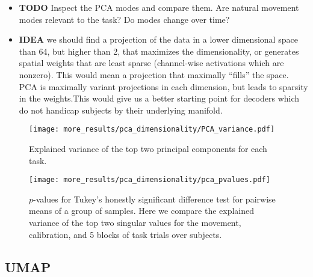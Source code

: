 \documentclass[../main.tex]{subfiles}
\begin{document}
\begin{itemize}
  \item \textbf{TODO} Inspect the PCA modes and compare them. Are natural movement modes relevant to the task? Do modes change over time?
  \item \textbf{IDEA} we should find a projection of the data in a lower dimensional space than 64, but higher than 2, that maximizes the dimensionality, or generates spatial weights that are least sparse (channel-wise activations which are nonzero). This would mean a projection that maximally ``fills'' the space. PCA is maximally variant projections in each dimension, but leads to sparsity in the weights.This would give us a better starting point for decoders which do not handicap subjects by their underlying manifold.
\end{itemize}


\begin{figure}[tph]
  \centering
  \texttt{[image: more\_results/pca\_dimensionality/PCA\_variance.pdf]}
  \caption[Explained variance for PCA over tasks]{Explained variance of the top two principal components for each task.}\label{fig:pca_variance}
\end{figure}


\begin{figure}[tph]
  \centering
  \texttt{[image: more\_results/pca\_dimensionality/pca\_pvalues.pdf]}
  \caption[Explained variance Tukey test]{$p$-values for Tukey's honestly significant difference test for pairwise means of a group of samples. Here we compare the explained variance of the top two singular values for the movement, calibration, and 5 blocks of task trials over subjects.}\label{fig:pca_pvalues}
\end{figure}











\subsection{UMAP}
\end{document}
